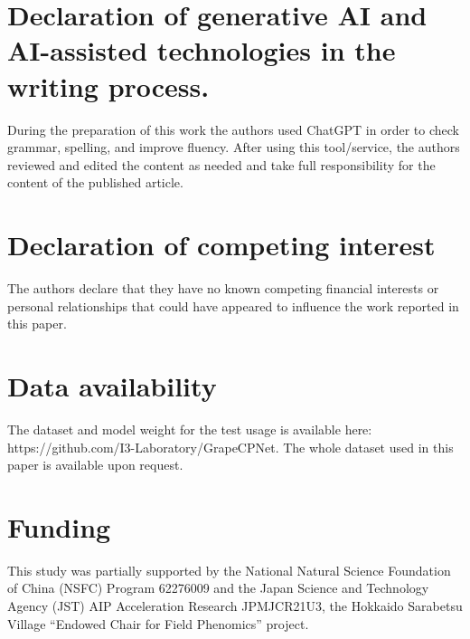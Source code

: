 \documentclass[12pt]{article}
\begin{document}
\section*{Declaration of generative AI and AI-assisted technologies in the writing process.}
During the preparation of this work the authors used ChatGPT in order to check grammar, spelling, and improve fluency. After using this tool/service, the authors reviewed and edited the content as needed and take full responsibility for the content of the published article.

\section*{Declaration of competing interest}
The authors declare that they have no known competing financial interests or personal relationships that could have appeared to influence the work reported in this paper.

\section*{Data availability}
The dataset and model weight for the test usage is available here: https://github.com/I3-Laboratory/GrapeCPNet. The whole dataset used in this paper is available upon request.

\section*{Funding}
This study was partially supported by the National Natural Science Foundation of China (NSFC) Program 62276009 and the Japan Science and Technology Agency (JST) AIP Acceleration Research JPMJCR21U3, the Hokkaido Sarabetsu Village “Endowed Chair for Field Phenomics” project.


{\clearpage}



\end{document}
